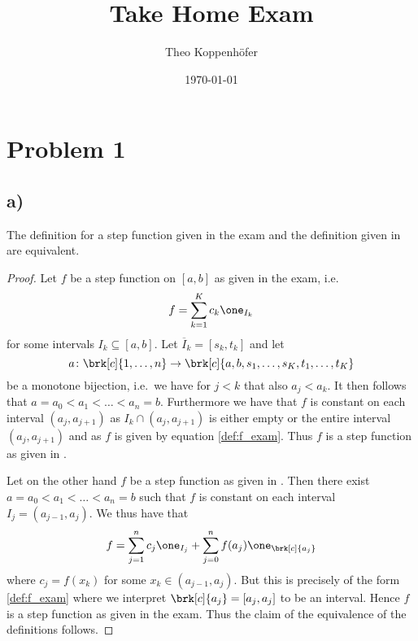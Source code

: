 





\subject{Specialised Course in Integration Theory, VT23}
\title{Take Home Exam}
\author{Theo Koppenhöfer}
\date{\today}








\maketitle

\section{Problem 1}
\subsection{a)}
\begin{claim}
The definition for a step function given in the exam and the definition given in \cite[Chapter 3.4]{CohnMT} are equivalent.
\end{claim}

\begin{proof}
Let $f$ be a step function on $[a,b]$ as given in the exam, i.e.
\begin{align}
	f=\sum_{k=1}^K c_k\one_{I_k}\label{def:f_exam}
\end{align}
for some intervals $I_k\subseteq[a,b]$. Let $\overline{I}_k=[s_k, t_k]$ and let $$a\colon\brk[c]{1,\dots,n}\to\brk[c]{a,b,s_1,\dots,s_K,t_1,\dots,t_K}$$ be a monotone bijection, i.e.\ we have for $j<k$ that also $a_j< a_k$. It then follows that
$a=a_0<a_1<\dots<a_n=b$. Furthermore we have that $f$ is constant on each interval $(a_j,a_{j+1})$ as $I_k\cap(a_j,a_{j+1})$ is either empty or the entire interval $(a_j,a_{j+1})$ and as $f$ is given by equation \ref{def:f_exam}. Thus $f$ is a step function as given in \cite[Chapter 3.4]{CohnMT}.

Let on the other hand $f$ be a step function as given in \cite[Chapter 3.4]{CohnMT}. Then there exist $a=a_0<a_1<\dots<a_n=b$ such that $f$ is constant on each interval $I_j=(a_{j-1},a_{j})$. We thus have that
\begin{align*}
	f=\sum_{j=1}^nc_j\one_{I_j}+\sum_{j=0}^nf(a_j)\one_{\brk[c]{a_j}}
\end{align*}
where $c_j=f(x_k)$ for some $x_k\in(a_{j-1},a_j)$. But this is precisely of the form \ref{def:f_exam} where we interpret $\brk[c]{a_j}=[a_j,a_j]$ to be an interval. Hence $f$ is a step function as given in the exam. Thus the claim of the equivalence of the definitions follows.
\end{proof}

